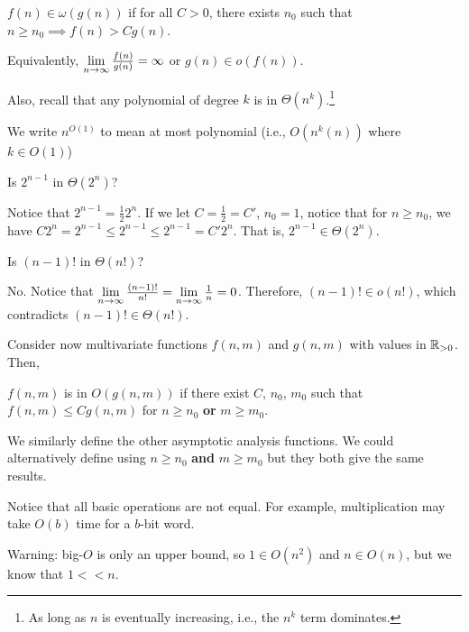\begin{defn}
  $f(n) \in \omega(g(n))$ if for all $C > 0$, there exists $n_0$
  such that $n \geq n_0 \implies f(n) > Cg(n)$.

  Equivalently, $\lim\limits_{n\to\infty}\frac{f(n)}{g(n)} = \infty$ or $g(n) \in o(f(n))$.
\end{defn}

Also, recall that any polynomial of degree $k$ is in $\Theta(n^k)$.\footnote{As long as $n$ is eventually increasing, i.e., the $n^k$ term dominates.}

We write $n^{O(1)}$ to mean at most polynomial (i.e., $O(n^k(n))$ where $k \in O(1)$)

\begin{xca}
  Is $2^{n-1}$ in $\Theta(2^n)$?
\end{xca}
\begin{prf}
  Notice that $2^{n-1} = \frac12 2^n$.
  If we let $C = \frac12 = C'$, $n_0 = 1$, notice that for $n \geq n_0$,
  we have $C 2^n = 2^{n-1} \leq 2^{n-1} \leq 2^{n-1} = C'2^n$.
  That is, $2^{n-1} \in \Theta(2^n)$.
\end{prf}

\begin{xca}
  Is $(n-1)!$ in $\Theta(n!)$?
\end{xca}
\begin{sol}
  No. Notice that $\lim\limits_{n\to\infty} \frac{(n-1)!}{n!} = \lim\limits_{n\to\infty} \frac1n = 0$.
  Therefore, $(n-1)! \in o(n!)$, which contradicts $(n-1)! \in \Theta(n!)$.
\end{sol}

Consider now multivariate functions $f(n,m)$ and $g(n,m)$
with values in $\mathbb{R}_{>0}$. Then,

\begin{defn*}
  $f(n,m)$ is in $O(g(n,m))$ if there exist $C$, $n_0$, $m_0$
  such that $f(n,m) \leq C g(n,m)$ for $n \geq n_0$ \textbf{or} $m \geq m_0$.
\end{defn*}

We similarly define the other asymptotic analysis functions.
We could alternatively define using $n \geq n_0$ \textbf{and} $m \geq m_0$
but they both give the same results.


Notice that all basic operations are not equal.
For example, multiplication may take $O(b)$ time for a $b$-bit word.

Warning: big-$O$ is only an upper bound, so $1 \in O(n^2)$ and $n \in O(n)$, but we know that $1 << n$.

